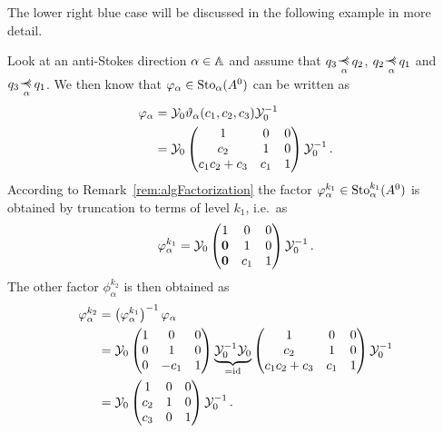 The lower right blue case will be discussed in the following example in more
detail.
\begin{exmp}\label{exmp:decompositionHere}
  Look at an anti-Stokes direction $\alpha\in\mathbb{A}$ and assume that
  $q_3\myrel{\alpha}q_2$, $q_2\myrel{\alpha}q_1$ and $q_3\myrel{\alpha}q_1$. We
  then know that $\varphi_\alpha\in \operatorname{Sto}_\alpha(A^0)$ can be written as
  \begin{align*}
    \varphi_\alpha &= \mathcal{Y}_{0}\vartheta_\alpha(c_1,c_2,c_3) \mathcal{Y}_{0}^{-1}
    \\&
    =\mathcal{Y}_{0}
    \begin{pmatrix} 1 & 0 & 0 \\c_2 & 1 & 0 \\c_1c_2+c_3 & c_1 & 1 \end{pmatrix}
    \mathcal{Y}_{0}^{-1}
    \,.
  \end{align*}
  According to Remark~\ref{rem:algFactorization} the factor
  $\varphi_\alpha^{k_1}\in\operatorname{Sto}_\alpha^{k_1}(A^0)$ is obtained by truncation to
  terms of level $k_1$, i.e.\ as
  \[
    \varphi_\alpha^{k_1}=
    \mathcal{Y}_{0}
    \begin{pmatrix}
      1 & 0 & 0
    \\\text{\boldmath $0$} & 1 & 0
    \\\text{\boldmath $0$} & c_1 & 1
    \end{pmatrix}
    \mathcal{Y}_{0}^{-1}
    \,.
  \]
  The other factor $\phi_\alpha^{k_2}$ is then obtained as
  \begin{align*}
    \phi_\alpha^{k_2}&=
    \left(\phi_\alpha^{k_1}\right)^{-1}
    \phi_\alpha
  \\&=\cY_{0}
    \begin{pmatrix}
      1     & 0    & 0
    \\0     & 1    & 0
    \\0     & -c_1 & 1
    \end{pmatrix}
    \underset{=\id}{\underbrace{%
        \cY_{0}^{-1}
        \cY_{0}
    }}
    \begin{pmatrix} 1 & 0 & 0 \\c_2 & 1 & 0 \\c_1c_2+c_3 & c_1 & 1 \end{pmatrix}
    \cY_{0}^{-1}
  \\&=\cY_{0}
    \begin{pmatrix}
      1     & 0 & 0
    \\c_2     & 1          & 0
    \\c_3     & 0          & 1
    \end{pmatrix}
    \cY_{0}^{-1}
    \,.
  \end{align*}
\end{exmp}
